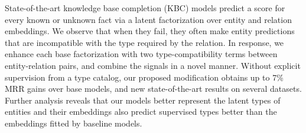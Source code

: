 State-of-the-art knowledge base completion (KBC) models predict a score for every known or unknown fact via a latent factorization over entity and relation embeddings. We observe that when they fail, they often make entity predictions that are incompatible with the type required by the relation. In response, we enhance each base factorization with two type-compatibility terms between entity-relation pairs, and combine the signals in a novel manner. Without explicit supervision from a type catalog, our proposed modification obtains up to 7\% MRR gains over base models, and new state-of-the-art results on several datasets.  Further analysis reveals that our models better represent the latent types of entities and their embeddings also predict supervised types better than the embeddings fitted by baseline models.
